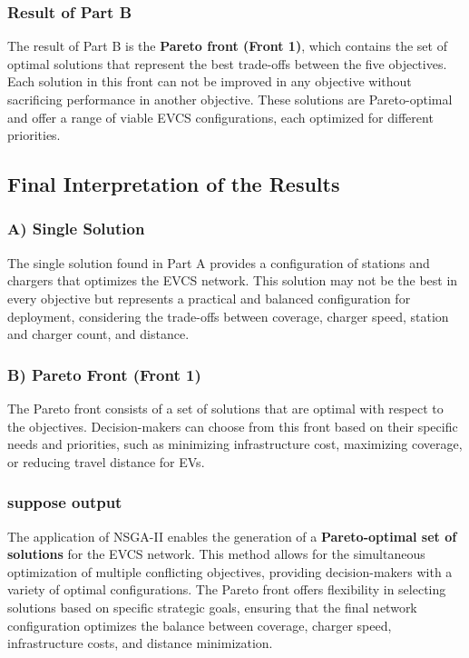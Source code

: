 \subsubsection{Result of Part B}
The result of Part B is the \textbf{Pareto front (Front 1)}, which contains the set of optimal solutions that represent the best trade-offs between the five objectives. Each solution in this front can not be improved in any objective without sacrificing performance in another objective. These solutions are Pareto-optimal and offer a range of viable EVCS configurations, each optimized for different priorities.

\subsection{Final Interpretation of the Results}

\subsubsection{A) Single Solution}
The single solution found in Part A provides a configuration of stations and chargers that optimizes the EVCS network. This solution may not be the best in every objective but represents a practical and balanced configuration for deployment, considering the trade-offs between coverage, charger speed, station and charger count, and distance.

\subsubsection{B) Pareto Front (Front 1)}
The Pareto front consists of a set of solutions that are optimal with respect to the objectives. Decision-makers can choose from this front based on their specific needs and priorities, such as minimizing infrastructure cost, maximizing coverage, or reducing travel distance for EVs.

\subsubsection{suppose output}

The application of NSGA-II enables the generation of a \textbf{Pareto-optimal set of solutions} for the EVCS network. This method allows for the simultaneous optimization of multiple conflicting objectives, providing decision-makers with a variety of optimal configurations. The Pareto front offers flexibility in selecting solutions based on specific strategic goals, ensuring that the final network configuration optimizes the balance between coverage, charger speed, infrastructure costs, and distance minimization.






